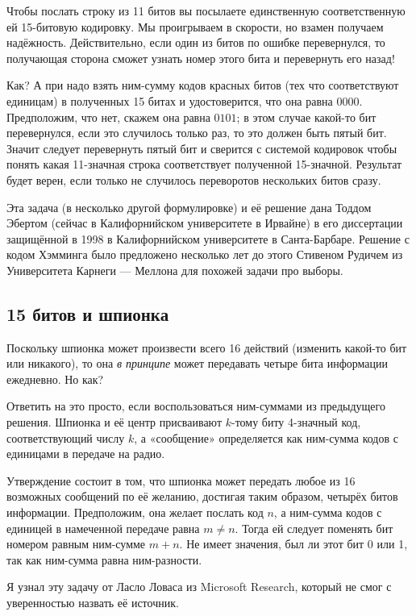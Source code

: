 Чтобы послать строку из 11 битов вы посылаете единственную соответственную ей 15-битовую кодировку.
Мы проигрываем в скорости, но взамен получаем надёжность.
Действительно, если один из битов по ошибке перевернулся, то получающая сторона сможет узнать номер этого бита и перевернуть его назад!

Как? А при надо взять ним-сумму кодов красных битов (тех что соответствуют единицам) в полученных 15 битах и удостоверится, что она равна $0000$.
Предположим, что нет, скажем она равна $0101$;
в этом случае какой-то бит перевернулся, если это случилось только раз, то это должен быть пятый бит.
Значит следует перевернуть пятый бит и сверится с системой кодировок чтобы понять какая 11-значная строка соответствует полученной 15-значной.
Результат будет верен, если только не случилось переворотов нескольких битов сразу.

\medskip

Эта задача (в несколько другой формулировке) и её решение дана Тоддом Эбертом (сейчас в Калифорнийском университете в Ирвайне) в его диссертации защищённой в 1998 в Калифорнийском университете в Санта-Барбаре.
Решение с кодом Хэмминга было предложено несколько лет до этого Стивеном Рудичем из Университета Карнеги — Меллона  для похожей задачи про выборы.

\subsection*{15 битов и шпионка}

Поскольку шпионка может произвести всего 16 действий (изменить какой-то бит или никакого), то она \emph{в принципе} может передавать четыре бита информации ежедневно.
Но как?

Ответить на это просто, если воспользоваться ним-суммами из предыдущего решения.
Шпионка и её центр присваивают $k$-тому биту 4-значный код, соответствующий числу $k$, а «сообщение» определяется как ним-сумма кодов с единицами в передаче на радио.

Утверждение состоит в том, что шпионка может передать любое из 16 возможных сообщений по её желанию,
достигая таким образом, четырёх битов информации.
Предположим, она желает послать код $n$, а ним-сумма кодов с единицей в намеченной передаче равна $m\ne n$.
Тогда ей следует поменять бит номером равным ним-сумме $m+n$.
Не имеет значения, был ли этот бит 0 или 1, так как ним-сумма равна ним-разности.
\heart

\medskip

Я узнал эту задачу от Ласло Ловаса из Microsoft Research, который не смог с уверенностью назвать её источник.

